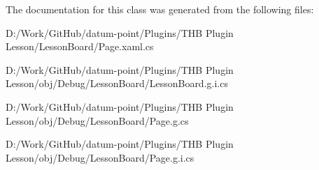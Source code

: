 The documentation for this class was generated from the following files\+:\begin{DoxyCompactItemize}
\item 
D\+:/\+Work/\+Git\+Hub/datum-\/point/\+Plugins/\+T\+H\+B Plugin Lesson/\+Lesson\+Board/Page.\+xaml.\+cs\item 
D\+:/\+Work/\+Git\+Hub/datum-\/point/\+Plugins/\+T\+H\+B Plugin Lesson/obj/\+Debug/\+Lesson\+Board/Lesson\+Board.\+g.\+i.\+cs\item 
D\+:/\+Work/\+Git\+Hub/datum-\/point/\+Plugins/\+T\+H\+B Plugin Lesson/obj/\+Debug/\+Lesson\+Board/Page.\+g.\+cs\item 
D\+:/\+Work/\+Git\+Hub/datum-\/point/\+Plugins/\+T\+H\+B Plugin Lesson/obj/\+Debug/\+Lesson\+Board/Page.\+g.\+i.\+cs\end{DoxyCompactItemize}
